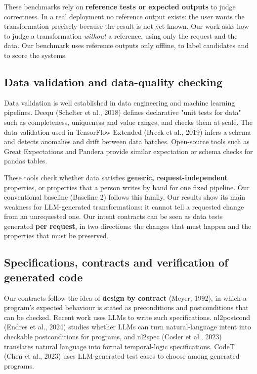 \documentclass[11pt]{article}
\begin{document}
These benchmarks rely on \textbf{reference tests or expected outputs} to
judge correctness. In a real deployment no reference output exists: the
user wants the transformation precisely because the result is not yet
known. Our work asks how to judge a transformation \emph{without} a
reference, using only the request and the data. Our benchmark uses
reference outputs only offline, to label candidates and to score the
systems.

\subsection{Data validation and data-quality checking}

Data validation is well established in data engineering and machine
learning pipelines. Deequ (Schelter et al., 2018) defines declarative
"unit tests for data" such as completeness, uniqueness and value ranges,
and checks them at scale. The data validation used in TensorFlow
Extended (Breck et al., 2019) infers a schema and detects anomalies and
drift between data batches. Open-source tools such as Great Expectations
and Pandera provide similar expectation or schema checks for pandas
tables.

These tools check whether data satisfies \textbf{generic,
request-independent} properties, or properties that a person writes by
hand for one fixed pipeline. Our conventional baseline (Baseline 2)
follows this family. Our results show its main weakness for
LLM-generated transformations: it cannot tell a requested change from an
unrequested one. Our intent contracts can be seen as data tests
generated \textbf{per request}, in two directions: the changes that must
happen and the properties that must be preserved.

\subsection{Specifications, contracts and verification of generated
code}

Our contracts follow the idea of \textbf{design by contract} (Meyer,
1992), in which a program's expected behaviour is stated as
preconditions and postconditions that can be checked. Recent work uses
LLMs to write such specifications. nl2postcond (Endres et al., 2024)
studies whether LLMs can turn natural-language intent into checkable
postconditions for programs, and nl2spec (Cosler et al., 2023)
translates natural language into formal temporal-logic specifications.
CodeT (Chen et al., 2023) uses LLM-generated test cases to choose among
generated programs.
\end{document}
